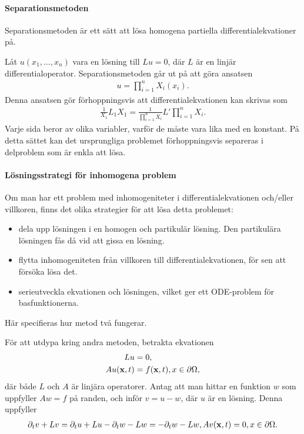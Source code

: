 \paragraph{Separationsmetoden}
Separationsmetoden är ett sätt att lösa homogena partiella differentialekvationer på.

Låt $u(x_{1}, \dots, x_{n})$ vara en lösning till $Lu = 0$, där $L$ är en linjär differentialoperator. Separationsmetoden går ut på att göra ansatsen
\begin{align*}
	u = \prod\limits_{i = 1}^{n}X_{i}(x_{i}).
\end{align*}
Denna ansatsen gör förhoppningsvis att differentialekvationen kan skrivas som
\begin{align*}
	\frac{1}{X_{1}}L_{1}X_{1} = \frac{1}{\prod\limits_{i = 1}^{n}X_{i}}L'\prod\limits_{i = 1}^{n}X_{i}.
\end{align*}
Varje sida beror av olika variabler, varför de måste vara lika med en konstant. På detta sättet kan det ursprungliga problemet förhoppningsvis separeras i delproblem som är enkla att lösa.

\paragraph{Lösningsstrategi för inhomogena problem}
Om man har ett problem med inhomogeniteter i differentialekvationen och/eller villkoren, finns det olika strategier för att lösa detta problemet:
\begin{itemize}
	\item dela upp lösningen i en homogen och partikulär lösning. Den partikulära lösningen fås då vid att gissa en lösning.
	\item flytta inhomogeniteten från villkoren till differentialekvationen, för sen att försöka lösa det.
	\item serieutveckla ekvationen och lösningen, vilket ger ett ODE-problem för basfunktionerna.
\end{itemize}
Här specifieras hur metod två fungerar.

För att utdypa kring andra metoden, betrakta ekvationen
\begin{align*}
	Lu            &= 0, \\
	Au(\vb{x}, t) &= f(\vb{x}, t), x\in\partial \Omega,
\end{align*}
där både $L$ och $A$ är linjära operatorer. Antag att man hittar en funktion $w$ som uppfyller $Aw = f$ på randen, och inför $v = u - w$, där $u$ är en lösning. Denna uppfyller
\begin{align*}
	\partial_{t}v + Lv = \partial_{t}u + Lu - \partial_{t}w - Lw = -\partial_{t}w - Lw,
	Av(\vb{x}, t) = 0, x\in\partial \Omega.
\end{align*}

